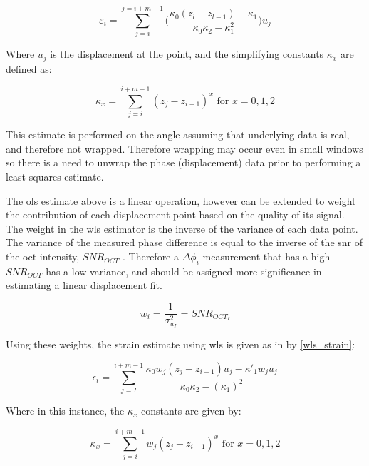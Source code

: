 \begin{equation}
	\label{ols_strain}
	\varepsilon_i = \sum\limits_{j=i}^{j=i+m-1} \bigg(\frac{\kappa_0 (z_l-z_{l-1})-\kappa_1}{\kappa_0 \kappa_2 - \kappa_1^2} \bigg) u_j
\end{equation}

Where $u_j$ is the displacement at the point, and the simplifying constants $\kappa_x$ are defined as:

\begin{equation}
	\label{ols_k}
	\kappa_x = \sum \limits_{j=i}^{i+m-1} (z_j - z_{i-1})^x \text{   for   } x = 0,1,2
\end{equation}

This estimate is performed on the angle assuming that underlying data is real, and therefore not wrapped. Therefore wrapping may occur even in small windows so there is a need to unwrap the phase (displacement) data prior to performing a least squares estimate. 

The \ac{ols} estimate above is a linear operation, however can be extended to weight the contribution of each displacement point based on the quality of its signal. 
The weight in the \ac{wls} estimator is the inverse of the variance of each data point.
The variance of the measured phase difference is equal to the inverse of the \ac{snr} of the \ac{oct} intensity, $SNR_{OCT}$ \cite{goodman_statistical_2015}. Therefore a $\Delta \phi_i$ measurement that has a high $SNR_{OCT}$ has a low variance, and should be assigned more significance in estimating a linear displacement fit. 

\begin{equation}
	\label{wls_w}
	w_i = \frac{1}{\sigma_{u_I}^2} = SNR_{OCT_I}
\end{equation}

Using these weights, the strain estimate using \ac{wls} is given as in \cite{kennedy_strain_2012} by \autoref{wls_strain}:

\begin{equation}
	\label{wls_strain}
	\epsilon_i = \sum \limits_{j=I}^{i+m-1} \frac{\kappa_0 w_j (z_j - z_{i-1}) u_j - \kappa'_1 w_	j u_j}{\kappa_0 \kappa_2 - (\kappa_1)^2}
\end{equation}

Where in this instance, the $\kappa_x$ constants are given by:

\begin{equation}
	\label{wls_k}
	\kappa_x = \sum \limits_{j=i}^{i+m-1} w_j (z_j - z_{i-1})^x \text{   for   } x=0,1,2
\end{equation}

